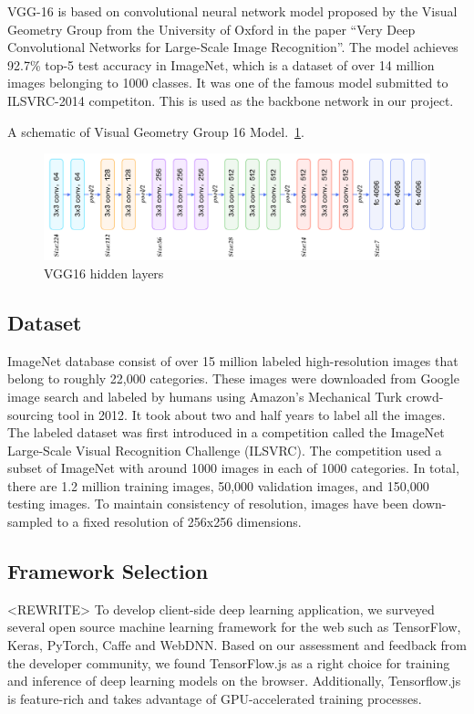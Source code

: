 VGG-16 is based on convolutional neural network model proposed by the Visual Geometry Group from the University of Oxford in the paper “Very Deep Convolutional Networks for Large-Scale Image Recognition”.  The model achieves 92.7\% top-5 test accuracy in ImageNet, which is a dataset of over 14 million images belonging to 1000 classes. It was one of the famous model submitted to ILSVRC-2014 competiton. This is used as the backbone network in our project.

A schematic of Visual Geometry Group 16 Model.~\ref{fig:CNN-1}.
\begin{figure}[htbp]
\centering
\includegraphics[width=1\textwidth]{images/cnn-vgg16-1.png}
\caption{VGG16 hidden layers}
\label{fig:CNN-1}
\end{figure}

\subsection{Dataset}

ImageNet database consist of over 15 million labeled high-resolution images that belong to roughly 22,000 categories. These images were downloaded from Google image search and labeled by humans using Amazon's Mechanical Turk crowd-sourcing tool in 2012. It took about two and half years to label all the images. The labeled dataset was first introduced in a competition called the ImageNet Large-Scale Visual Recognition Challenge (ILSVRC). The competition used a subset of ImageNet with around 1000 images in each of 1000 categories. In total, there are 1.2 million training images, 50,000 validation images, and 150,000 testing images. To maintain consistency of resolution, images have been down-sampled to a fixed resolution of 256x256 dimensions.
    
\subsection{Framework Selection}

<REWRITE> To develop client-side deep learning application, we surveyed several open source machine learning framework for the web such as TensorFlow, Keras, PyTorch, Caffe and WebDNN. Based on our assessment and feedback from the developer community, we found TensorFlow.js as a right choice for training and inference of deep learning models on the browser. Additionally, Tensorflow.js is feature-rich and takes advantage of GPU-accelerated training processes. 

